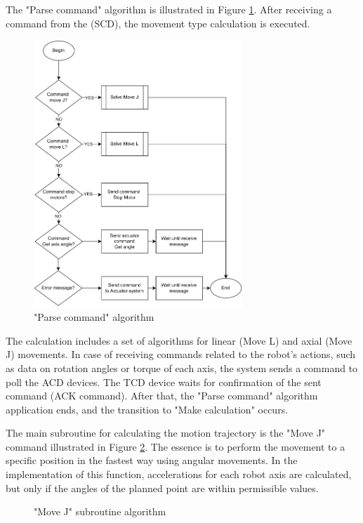 The "Parse command" algorithm is illustrated in Figure \ref{AlgParse}. After receiving a command from the (SCD), the movement type calculation is executed.

\begin{figure}[H]
	\centering
	\includegraphics[width=0.7\textwidth]{Src/images/parse.png}
	\caption{"Parse command" algorithm}
	\label{AlgParse}
\end{figure}
The calculation includes a set of algorithms for linear (Move L) and axial (Move J) movements. In case of receiving commands related to the robot's actions, such as data on rotation angles or torque of each axis, the system sends a command to poll the ACD devices. The TCD device waits for confirmation of the sent command (ACK command). After that, the "Parse command" algorithm application ends, and the transition to "Make calculation" occurs.

The main subroutine for calculating the motion trajectory is the "Move J" command illustrated in Figure \ref{AlgJ}. The essence is to perform the movement to a specific position in the fastest way using angular movements. In the implementation of this function, accelerations for each robot axis are calculated, but only if the angles of the planned point are within permissible values.

\begin{figure}[H]
	\centering
	
	\caption{"Move J" subroutine algorithm}
	\label{AlgJ}
\end{figure}

